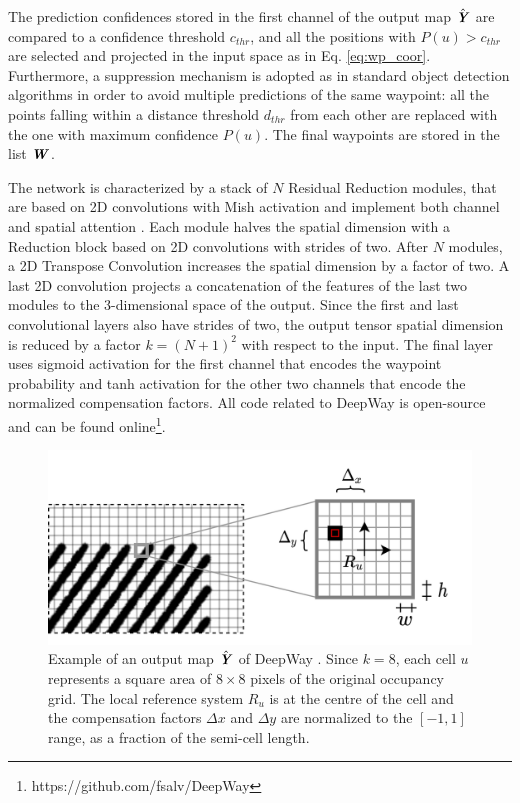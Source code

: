 \documentclass[journal]{IEEEtran}
\begin{document}
The prediction confidences stored in the first channel of the output map $\hat{\textbf{\textit{Y}}}$ are compared to a confidence threshold $c_{thr}$, and all the positions with $P(u) > c_{thr}$ are selected and projected in the input space as in Eq. \ref{eq:wp_coor}. Furthermore, a suppression mechanism is adopted as in standard object detection algorithms in order to avoid multiple predictions of the same waypoint: all the points falling within a distance threshold $d_ {thr}$ from each other are replaced with the one with maximum confidence $P(u)$. The final waypoints are stored in the list ${\textbf{\emph{W}}}$.

The network is characterized by a stack of $N$ Residual Reduction modules, that are based on 2D convolutions with Mish activation \cite{misra2019mish} and implement both channel and spatial attention \cite{woo2018cbam}. Each module halves the spatial dimension with a Reduction block based on 2D convolutions with strides of two. After $N$ modules, a 2D Transpose Convolution increases the spatial dimension by a factor of two. A last 2D convolution projects a concatenation of the features of the last two modules to the 3-dimensional space of the output. Since the first and last convolutional layers also have strides of two, the output tensor spatial dimension is reduced by a factor $k = (N+1)^2$ with respect to the input. The final layer uses sigmoid activation for the first channel that encodes the waypoint probability and tanh activation for the other two channels that encode the normalized compensation factors. All code related to DeepWay is open-source and can be found online\footnote{https://github.com/fsalv/DeepWay}.

\begin{figure}[!h]
\centering
\includegraphics[width=0.95\columnwidth]{grid_ex.png}
\caption{Example of an output map $\hat{\textbf{\textit{Y}}}$ of DeepWay \cite{mazzia2021deepway}. Since $k=8$, each cell $u$ represents a square area of $8 \times 8$ pixels of the original occupancy grid. The local reference system $R_u$ is at the centre of the cell and the compensation factors $\Delta x$ and $\Delta y$ are normalized to the $[-1,1]$ range, as a fraction of the semi-cell length.}
\label{fig:grid_example}
\end{figure}
\end{document}
